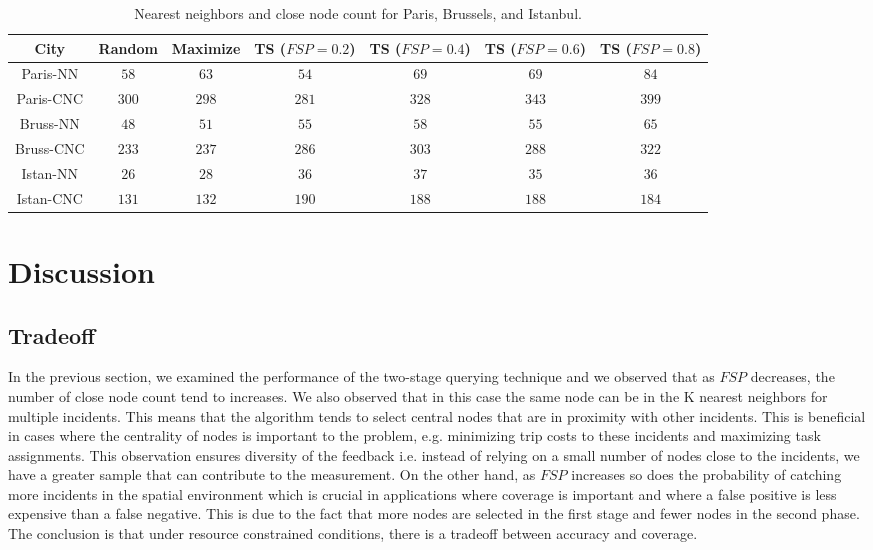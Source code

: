 \documentclass{acm_proc_article-sp}
\begin{document}
\begin{table}[!h]
\centering
\begin{tabulary}{0.5\textwidth}{|C|C|C|C|C|C|C|}
\hline
City & Random & Maximize & TS ($FSP = 0.2$) & TS ($FSP = 0.4$)  & TS ($FSP = 0.6$)  &TS ($FSP = 0.8$)   \\ \hline
Paris-NN & $58$ & $63$  & $54$  & $69$ & $69$ & $84$  \\ \hline
Paris-CNC   & $300$ & $298$  & $281$  & $328$ & $343$ & $399$  \\ \hline
Bruss-NN & $48$ & $51$  & $55$  & $58$ & $55$ & $65$  \\ \hline
Bruss-CNC   & $233$ & $237$  & $286$  & $303$ & $288$ & $322$  \\ \hline
Istan-NN & $26$ & $28$  & $36$  & $37$ & $35$ & $36$  \\ \hline
Istan-CNC   & $131$ & $132$  & $190$  & $188$ & $188$ & $184$  \\ \hline
\end{tabulary}
\caption{Nearest neighbors and close node count for Paris, Brussels, and Istanbul.}
\label{table:NNParis}
\end{table}


\section{Discussion}

\subsection{Tradeoff}
In the previous section, we examined the performance of the two-stage querying technique and we observed that as $FSP$ decreases, the number of close node count tend to increases. We also observed that in this case the same node can be in the K nearest neighbors for multiple incidents. This means that the algorithm tends to select central nodes that are in proximity with other incidents. This is beneficial in cases where the centrality of nodes is important to the problem, e.g. minimizing trip costs to these incidents and maximizing task assignments. This observation ensures diversity of the feedback i.e. instead of relying on a small number of nodes close to the incidents, we have a greater sample that can contribute to the measurement.
On the other hand, as $FSP$ increases so does the probability of catching more incidents in the spatial environment which is crucial in applications where coverage is important and where a false positive is less expensive than a false negative. This is due to the fact that more nodes are selected in the first stage and fewer nodes in the second phase. The conclusion is that under resource constrained conditions, there is a tradeoff between accuracy and coverage.
\end{document}
